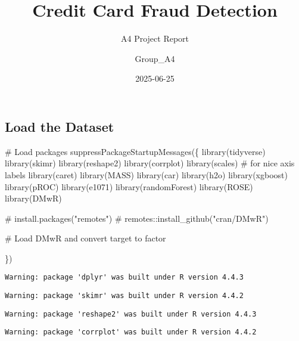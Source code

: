 \documentclass[
  11pt,
  letterpaper,
  DIV=11,
  numbers=noendperiod]{scrartcl}
\title{Credit Card Fraud Detection}
\subtitle{A4 Project Report}
\author{Group\_A4}
\date{2025-06-25}
\newenvironment{Shaded}{}{}
\newcommand{\CommentTok}[1]{\textcolor[rgb]{0.42,0.45,0.49}{#1}}
\newcommand{\FunctionTok}[1]{\textcolor[rgb]{0.44,0.26,0.76}{#1}}
\newcommand{\NormalTok}[1]{\textcolor[rgb]{0.14,0.16,0.18}{#1}}
\renewcommand*\contentsname{Table of contents}
\newcommand\contentsname{Table of contents}
\begin{document}
\maketitle

\renewcommand*\contentsname{Table of contents}
{
\hypersetup{linkcolor=}
\setcounter{tocdepth}{3}
\tableofcontents
}

\subsection{Load the Dataset}\label{load-the-dataset}

\begin{Shaded}
\begin{Highlighting}[]
\CommentTok{\# Load packages}
\FunctionTok{suppressPackageStartupMessages}\NormalTok{(\{}
\FunctionTok{library}\NormalTok{(tidyverse)}
\FunctionTok{library}\NormalTok{(skimr)}
\FunctionTok{library}\NormalTok{(reshape2)}
\FunctionTok{library}\NormalTok{(corrplot)}
\FunctionTok{library}\NormalTok{(scales)  }\CommentTok{\# for nice axis labels}
\FunctionTok{library}\NormalTok{(caret)}
\FunctionTok{library}\NormalTok{(MASS)}
\FunctionTok{library}\NormalTok{(car)}
\FunctionTok{library}\NormalTok{(h2o)}
\FunctionTok{library}\NormalTok{(xgboost)}
\FunctionTok{library}\NormalTok{(pROC)}
\FunctionTok{library}\NormalTok{(e1071)}
\FunctionTok{library}\NormalTok{(randomForest)}
\FunctionTok{library}\NormalTok{(ROSE)}
\FunctionTok{library}\NormalTok{(DMwR)}
  
\CommentTok{\# install.packages("remotes")}
\CommentTok{\# remotes::install\_github("cran/DMwR")}

\CommentTok{\# Load DMwR and convert target to factor}

\NormalTok{\})}
\end{Highlighting}
\end{Shaded}

\begin{verbatim}
Warning: package 'dplyr' was built under R version 4.4.3
\end{verbatim}

\begin{verbatim}
Warning: package 'skimr' was built under R version 4.4.2
\end{verbatim}

\begin{verbatim}
Warning: package 'reshape2' was built under R version 4.4.3
\end{verbatim}

\begin{verbatim}
Warning: package 'corrplot' was built under R version 4.4.2
\end{verbatim}
\end{document}
